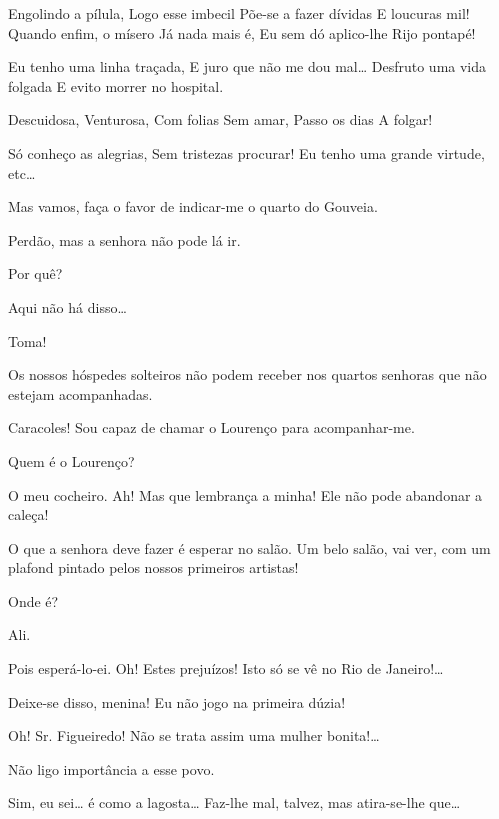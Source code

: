  Engolindo a pílula,
 Logo esse imbecil
 Põe-se a fazer dívidas
 E loucuras mil!
 Quando enfim, o mísero
 Já nada mais é,
 Eu sem dó aplico-lhe
 Rijo pontapé!
 
 Eu tenho uma linha traçada,
 E juro que não me dou mal\ldots{}
 Desfruto uma vida folgada
 E evito morrer no hospital.
 
 Descuidosa,
 Venturosa,
 Com folias
 Sem amar,
 Passo os dias
 A folgar!
 
 Só conheço as alegrias,
 Sem tristezas procurar!
 Eu tenho uma grande virtude, etc\ldots{}

Mas vamos, faça o favor de indicar-me o quarto do Gouveia.

 Perdão, mas a senhora não pode lá ir.

 Por quê?

 Aqui não há disso\ldots{}

  Toma!

 Os nossos hóspedes solteiros não podem receber nos quartos
senhoras que não estejam acompanhadas.

 Caracoles! Sou capaz de chamar o Lourenço para acompanhar-me.

 Quem é o Lourenço?

 O meu cocheiro. Ah! Mas que lembrança a minha! Ele não pode
abandonar a caleça!

 O que a senhora deve fazer é esperar no salão. Um belo salão,
vai ver, com um plafond pintado pelos nossos primeiros artistas!

 Onde é?

  Ali.

 Pois esperá-lo-ei. Oh! Estes prejuízos! Isto só se vê no Rio de
Janeiro!\ldots{} 

 Deixe-se disso, menina! Eu não jogo na primeira dúzia! 


 Oh! Sr. Figueiredo! Não se trata assim uma mulher bonita!\ldots{}

 Não ligo importância a esse povo.

 Sim, eu sei\ldots{} é como a lagosta\ldots{} Faz-lhe mal, talvez, mas
atira-se-lhe que\ldots{}

